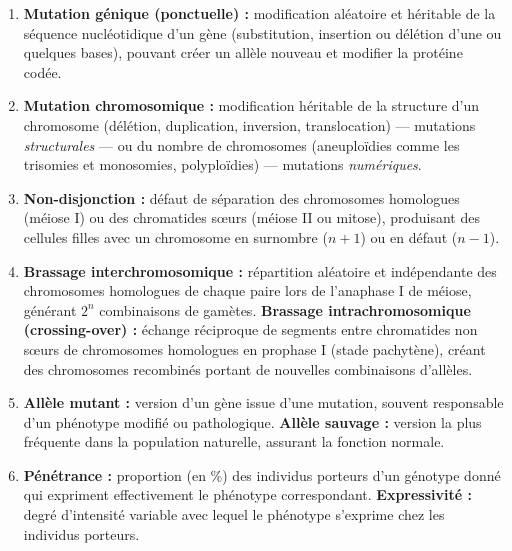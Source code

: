 \documentclass[11pt]{article}
\begin{document}
\begin{corrige}
\begin{enumerate}
    \item \textbf{Mutation génique (ponctuelle) :} modification aléatoire et héritable de la séquence nucléotidique d'un gène (substitution, insertion ou délétion d'une ou quelques bases), pouvant créer un allèle nouveau et modifier la protéine codée.
    \item \textbf{Mutation chromosomique :} modification héritable de la structure d'un chromosome (délétion, duplication, inversion, translocation) — mutations \emph{structurales} — ou du nombre de chromosomes (aneuploïdies comme les trisomies et monosomies, polyploïdies) — mutations \emph{numériques}.
    \item \textbf{Non-disjonction :} défaut de séparation des chromosomes homologues (méiose I) ou des chromatides sœurs (méiose II ou mitose), produisant des cellules filles avec un chromosome en surnombre ($n+1$) ou en défaut ($n-1$).
    \item \textbf{Brassage interchromosomique :} répartition aléatoire et indépendante des chromosomes homologues de chaque paire lors de l'anaphase I de méiose, générant $2^n$ combinaisons de gamètes. \textbf{Brassage intrachromosomique (crossing-over) :} échange réciproque de segments entre chromatides non sœurs de chromosomes homologues en prophase I (stade pachytène), créant des chromosomes recombinés portant de nouvelles combinaisons d'allèles.
    \item \textbf{Allèle mutant :} version d'un gène issue d'une mutation, souvent responsable d'un phénotype modifié ou pathologique. \textbf{Allèle sauvage :} version la plus fréquente dans la population naturelle, assurant la fonction normale.
    \item \textbf{Pénétrance :} proportion (en \%) des individus porteurs d'un génotype donné qui expriment effectivement le phénotype correspondant. \textbf{Expressivité :} degré d'intensité variable avec lequel le phénotype s'exprime chez les individus porteurs.
\end{enumerate}
\end{corrige}
\end{document}
